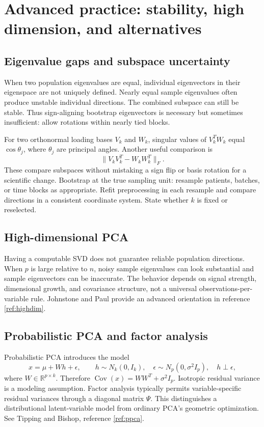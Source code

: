 \documentclass[11pt]{article}
\newcommand{\R}{\mathbb R}\newcommand{\tr}{\operatorname{tr}}\newcommand{\Cov}{\operatorname{Cov}}
\begin{document}
\section{Advanced practice: stability, high dimension, and alternatives}
\subsection{Eigenvalue gaps and subspace uncertainty}
When two population eigenvalues are equal, individual eigenvectors in their eigenspace are not uniquely defined. Nearly equal sample eigenvalues often produce unstable individual directions. The combined subspace can still be stable. Thus sign-aligning bootstrap eigenvectors is necessary but sometimes insufficient: allow rotations within nearly tied blocks.

For two orthonormal loading bases $V_k$ and $W_k$, singular values of $V_k^TW_k$ equal $\cos\theta_j$, where $\theta_j$ are principal angles. Another useful comparison is
\[
\|V_kV_k^T-W_kW_k^T\|_F.
\]
These compare subspaces without mistaking a sign flip or basis rotation for a scientific change. Bootstrap at the true sampling unit: resample patients, batches, or time blocks as appropriate. Refit preprocessing in each resample and compare directions in a consistent coordinate system. State whether $k$ is fixed or reselected.

\subsection{High-dimensional PCA}
Having a computable SVD does not guarantee reliable population directions. When $p$ is large relative to $n$, noisy sample eigenvalues can look substantial and sample eigenvectors can be inaccurate. The behavior depends on signal strength, dimensional growth, and covariance structure, not a universal observations-per-variable rule. Johnstone and Paul provide an advanced orientation in reference \ref{ref:highdim}.

\subsection{Probabilistic PCA and factor analysis}
Probabilistic PCA introduces the model
\[
x=\mu+Wh+\epsilon,\qquad h\sim N_k(0,I_k),\quad
\epsilon\sim N_p(0,\sigma^2I_p),\quad h\perp\epsilon,
\]
where $W\in\R^{p\times k}$. Therefore $\Cov(x)=WW^T+\sigma^2I_p$. Isotropic residual variance is a modeling assumption. Factor analysis typically permits variable-specific residual variances through a diagonal matrix $\Psi$. This distinguishes a distributional latent-variable model from ordinary PCA's geometric optimization. See Tipping and Bishop, reference \ref{ref:ppca}.
\end{document}
